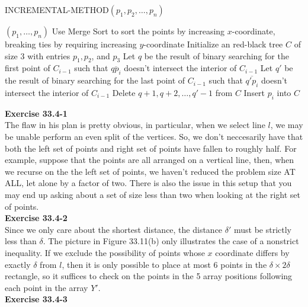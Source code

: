\documentclass{article}
\begin{document}
\begin{algorithm}
\caption{INCREMENTAL-METHOD$(p_1, p_2, \ldots, p_n)$}
\begin{algorithmic}
	\State \Return $(p_1, \ldots, p_n)$
\EndIf
\State Use Merge Sort to sort the points by increasing $x$-coordinate, breaking ties by requiring increasing $y$-coordinate
\State Initialize an red-black tree $C$ of size 3 with entries $p_1, p_2$, and $p_3$
	\State Let $q$ be the result of binary searching for the first point of $C_{i-1}$ such that $\overline{qp_i}$ doesn't intersect the interior of $C_{i-1}$
	\State Let $q'$ be the result of binary searching for the last point of $C_{i-1}$ such that $\overline{q'p_i}$ doesn't intersect the interior of $C_{i-1}$
	\State Delete $q+1, q+2, \ldots, q'-1$ from $C$
	\State Insert $p_i$ into $C$
\EndFor
\end{algorithmic}
\end{algorithm}

\noindent\textbf{Exercise 33.4-1}\\

The flaw in his plan is pretty obvious, in particular, when we select line $l$, we may be unable perform an even split of the vertices. So, we don't neccesarily have that both the left set of points and right set of points have fallen to roughly half. For example, suppose that the points are all arranged on a vertical line, then, when we recurse on the the left set of points, we haven't reduced the problem size AT ALL, let alone by a factor of two. There is also the issue in this setup that you may end up asking about a set of size less than two when looking at the right set of points.\\

\noindent\textbf{Exercise 33.4-2}\\

Since we only care about the shortest distance, the distance $\delta'$ must be strictly less than $\delta$.  The picture in Figure 33.11(b) only illustrates the case of a nonstrict inequality.  If we exclude the possibility of points whose $x$ coordinate differs by exactly $\delta$ from $l$, then it is only possible to place at most 6 points in the $\delta \times 2\delta$ rectangle, so it suffices to check on the points in the 5 array positions following each point in the array $Y'$. \\

\noindent\textbf{Exercise 33.4-3}\\
\end{document}
